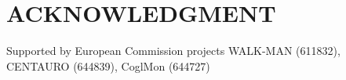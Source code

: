 \documentclass[letterpaper, 10 pt, conference]{ieeeconf}  %
\begin{document}








\section*{ACKNOWLEDGMENT}

Supported by European Commission projects WALK-MAN (611832), CENTAURO (644839), CoglMon (644727)







\end{document}
